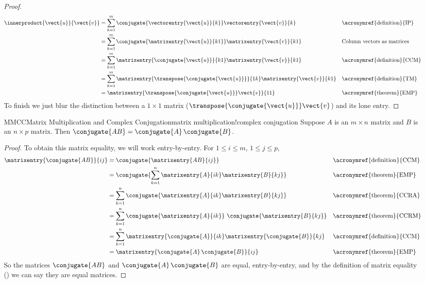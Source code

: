 %
\begin{proof}
%
\begin{align*}
\innerproduct{\vect{u}}{\vect{v}}
%
&=\sum_{k=1}^{m}\conjugate{\vectorentry{\vect{u}}{k}}\vectorentry{\vect{v}}{k}
&&\text{\acronymref{definition}{IP}}\\
%
&=\sum_{k=1}^{m}\conjugate{\matrixentry{\vect{u}}{k1}}\matrixentry{\vect{v}}{k1}
&&\text{Column vectors as matrices}\\
%
&=\sum_{k=1}^{m}\matrixentry{\conjugate{\vect{u}}}{k1}\matrixentry{\vect{v}}{k1}
&&\text{\acronymref{definition}{CCM}}\\
%
&=\sum_{k=1}^{m}\matrixentry{\transpose{\conjugate{\vect{u}}}}{1k}\matrixentry{\vect{v}}{k1}
&&\text{\acronymref{definition}{TM}}\\
%
&=\matrixentry{\transpose{\conjugate{\vect{u}}}\vect{v}}{11}
&&\text{\acronymref{theorem}{EMP}}\\
\end{align*}
%
To finish we just blur the distinction between a $1\times 1$ matrix ($\transpose{\conjugate{\vect{u}}}\vect{v}$) and its lone entry.
%
\end{proof}
%
\begin{theorem}{MMCC}{Matrix Multiplication and Complex Conjugation}{matrix multiplication!complex conjugation}
Suppose $A$ is an $m\times n$ matrix and $B$ is an $n\times p$ matrix.  Then $\conjugate{AB}=\conjugate{A}\,\conjugate{B}$.
\end{theorem}
%
\begin{proof}
%
To obtain this matrix equality, we will work entry-by-entry.  For $1\leq i\leq m$, $1\leq j\leq p$,
%
\begin{align*}
\matrixentry{\conjugate{AB}}{ij}
%
&=\conjugate{\matrixentry{AB}{ij}}
&&\text{\acronymref{definition}{CCM}}\\
%
&=\conjugate{\sum_{k=1}^{n}\matrixentry{A}{ik}\matrixentry{B}{kj}}
&&\text{\acronymref{theorem}{EMP}}\\
%
&=\sum_{k=1}^{n}\conjugate{\matrixentry{A}{ik}\matrixentry{B}{kj}}
&&\text{\acronymref{theorem}{CCRA}}\\
%
&=\sum_{k=1}^{n}\conjugate{\matrixentry{A}{ik}}\,\,\conjugate{\matrixentry{B}{kj}}
&&\text{\acronymref{theorem}{CCRM}}\\
%
&=\sum_{k=1}^{n}\matrixentry{\conjugate{A}}{ik}\matrixentry{\conjugate{B}}{kj}
&&\text{\acronymref{definition}{CCM}}\\
%
&=\matrixentry{\conjugate{A}\,\conjugate{B}}{ij}
&&\text{\acronymref{theorem}{EMP}}
%
\end{align*}
%
So the matrices $\conjugate{AB}$ and $\conjugate{A}\,\conjugate{B}$ are equal, entry-by-entry, and by the definition of matrix equality () we can say they are equal matrices.
%
\end{proof}

